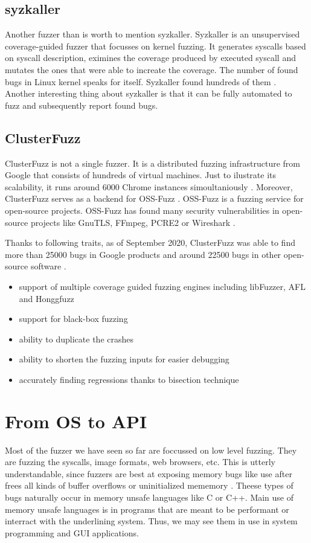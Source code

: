 \subsection{syzkaller}
Another fuzzer than is worth to mention syzkaller. Syzkaller is an unsupervised coverage-guided fuzzer that focusses on kernel fuzzing. It generates syscalls based on syscall description, eximines the coverage produced by executed syscall and mutates the ones that were able to increate the coverage. The number of found bugs in Linux kernel speaks for itself. Syzkaller found hundreds of them \cite{syzkaller2020bugs}. Another interesting thing about syzkaller is that it can be fully automated to fuzz and subsequently report found bugs.


\subsection{ClusterFuzz}
ClusterFuzz is not a single fuzzer. It is a distributed fuzzing infrastructure from Google that consists of hundreds of virtual machines. Just to ilustrate its scalability, it runs around 6000 Chrome instances simoultaniously \cite{xu2017designing}. Moreover, ClusterFuzz serves as a backend for OSS-Fuzz \cite{ossfuzz2020readme}. OSS-Fuzz is a fuzzing service for open-source projects. OSS-Fuzz has found many security vulnerabilities in open-source projects like GnuTLS, FFmpeg, PCRE2 or Wireshark \cite{chang2017oss}.

Thanks to following traits, as of September 2020, ClusterFuzz was able to find more than 25000 bugs in Google products and around 22500 bugs in other open-source software \cite{clusterfuzz2020readme}.

\begin{itemize}
    \item support of multiple coverage guided fuzzing engines including libFuzzer, AFL and Honggfuzz
    \item support for black-box fuzzing
    \item ability to duplicate the crashes
    \item ability to shorten the fuzzing inputs for easier debugging
    \item accurately finding regressions thanks to bisection technique
\end{itemize}


\section{From OS to API}
Most of the fuzzer we have seen so far are foccussed on low level fuzzing. They are fuzzing the syscalls, image formats, web browsers, etc. This is utterly understandable, since fuzzers are best at exposing memory bugs like use after frees all kinds of buffer overflows or uninitialized mememory \cite{chang2017oss}. Theese types of bugs naturally occur in memory unsafe languages like C or C++. Main use of memory unsafe languages is in programs that are meant to be performant or interract with the underlining system. Thus, we may see them in use in system programming and GUI applications.


